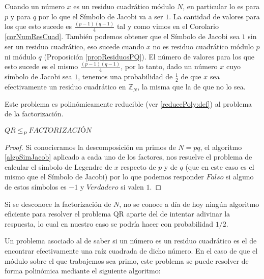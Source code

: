 Cuando un n\'umero $x$ es un residuo cuadr\'atico m\'odulo $N$, en particular lo
es para $p$ y para $q$ por lo que el S\'imbolo de Jacobi va a ser $1$. La cantidad
de valores para los que esto sucede es $\frac{(p-1)(q-1)}{4}$ tal y como vimos en
el Corolario \ref{corNumResCuad}. Tambi\'en podemos obtener que el S\'imbolo
de Jacobi sea $1$ sin ser un residuo cuadr\'atico, eso sucede cuando $x$ no es residuo
cuadr\'atico m\'odulo $p$ ni m\'odulo $q$ (Proposici\'on \ref{propResiduosPQ}). El n\'umero de valores para los que esto sucede
es el mismo $\frac{(p-1)(q-1)}{4}$, por lo tanto, dado un n\'umero $x$ cuyo s\'imbolo
de Jacobi sea $1$, tenemos una probabilidad de $\frac{1}{2}$ de que $x$ sea efectivamente
un residuo cuadr\'atico en ${\mathbb Z}_{N}$, la misma que la de que no lo sea.

Este problema es polin\'omicamente reducible (ver \ref{reducePoly:def}) al
problema de la factorizaci\'on.

\begin{proposition}
	 $QR \leq_P FACTORIZACIÓN$
\end{proposition}
\begin{proof}
Si conocieramos la descomposición en primos de $N = pq$, el algoritmo \ref{algoSimJacob} aplicado a cada uno de los factores,
nos resuelve el problema de calcular el símbolo de Legendre de $x$ respecto de $p$ y de $q$ (que en este caso es el mismo que el S\'imbolo de Jacobi)
por lo que podemos responder $Falso$ si alguno de estos s\'imbolos es $-1$ y $Verdadero$ si valen $1$.
\end{proof}

Si se desconoce la factorización de $N$, no se conoce a día de hoy ningún
algoritmo eficiente para resolver el problema QR aparte del de intentar
adivinar la respuesta, lo cual en nuestro caso se podr\'ia hacer con
probabilidad $1/2$.

Un problema asociado al de saber si un n\'umero es un residuo cuadr\'atico es el de encontrar efectivamente una ra\'iz cuadrada de dicho n\'umero.
En el caso de que el m\'odulo sobre el que trabajemos sea primo, este problema se puede resolver de forma polin\'omica mediante el siguiente algoritmo:

